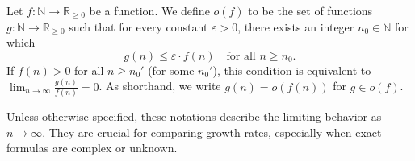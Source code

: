 \begin{definition}
    Let $f: \mathbb{N} \to \mathbb{R}_{\ge 0}$ be a function.
    We define $o(f)$  to be the set of functions $g: \mathbb{N} \to \mathbb{R}_{\ge 0}$
    such that for every constant $\varepsilon > 0$, there exists an integer $n_0 \in \mathbb{N}$ for which
    \[
        g(n) \leq \varepsilon \cdot f(n) \quad \text{for all } n \geq n_0.
    \]
    If $f(n) > 0$ for all $n \geq n_0'$ (for some $n_0'$),
    this condition is equivalent to $\lim_{n \to \infty} \frac{g(n)}{f(n)} = 0$.
    As shorthand, we write $g(n) = o(f(n))$ for $g \in o(f)$.
\end{definition}

Unless otherwise specified, these notations describe the limiting behavior as $n \to \infty$.
They are crucial for comparing growth rates, especially when exact formulas are complex or unknown.

